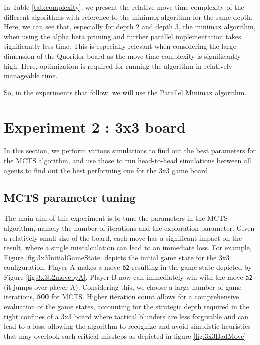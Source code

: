 In Table \ref{tab:complexity}, we present the relative move time complexity of the different algorithms with reference to the minimax algorithm for the same depth. Here, we can see that, especially for depth 2 and depth 3, the minimax algorithm, when using the alpha beta pruning and further parallel implementation takes significantly less time. This is especially relevant when considering the large dimension of the Quoridor board as the move time complexity is significantly high. Here, optimization is required for running the algorithm in relatively manageable time.

So, in the experiments that follow, we will use the Parallel Minimax algorithm.

\section{Experiment 2 : 3x3 board}

In this section, we perform various simulations to find out the best parameters for the \gls{MCTS} algorithm, and use those to run head-to-head simulations between all agents to find out the best performing one for the 3x3 game board.

\subsection{MCTS parameter tuning}

The main aim of this experiment is to tune the parameters in the MCTS algorithm, namely the number of iterations and the exploration parameter. Given a relatively small size of the board, each move has a significant impact on the result, where a single miscalculation can lead to an immediate loss. For example, Figure \ref{fig:3x3InitialGameState} depicts the initial game state for the 3x3 configuration. Player A makes a move \texttt{b2} resulting in the game state depicted by Figure \ref{fig:3x3b2movebyA}. Player B now can immediately win with the move \texttt{a2} (it jumps over player A). Considering this, we choose a large number of game iterations, \textbf{500} for MCTS. Higher iteration count allows for a comprehensive evaluation of the game states, accounting for the strategic depth required in the tight confines of a 3x3 board where tactical blunders are less forgivable and can lead to a loss, allowing the algorithm to recognize and avoid simplistic heuristics that may overlook such critical missteps as depicted in figure \ref{fig:3x3BadMove}

